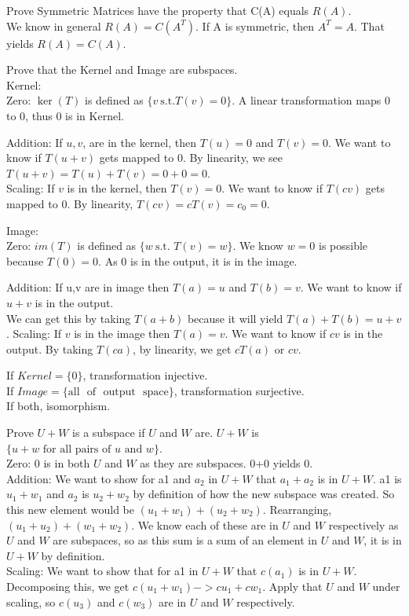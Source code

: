 \documentclass[12pt]{article}
\begin{document}
Prove Symmetric Matrices have the property that C(A) equals $R(A)$.\\
We know in general $R(A) = C(A^T)$. If A is symmetric, then $A^T=A$. That yields $R(A)=C(A)$.

Prove that the Kernel and Image are subspaces.\\
Kernel:\\
Zero: $\ker(T)$ is defined as $\{v ~ \text{s.t.} T(v) = 0\}$. A linear transformation maps 0 to 0, thus 0 is in Kernel.

Addition: If $u, v$, are in the kernel, then $T(u) = 0$ and $T(v) = 0$. We want to know if $T(u+v)$ gets
mapped to 0. By linearity, we see $T(u+v) = T(u)+T(v) = 0+0 = 0$.\\
Scaling: If $v$ is in the kernel, then $T(v) = 0$. We want to know if $T(cv)$ gets mapped to 0. By
linearity, $T(cv) = cT(v) = c_0 = 0$.

Image:\\
Zero: $im(T)$ is defined as $\{w ~ \text{s.t.  }  T(v) = w\}$. We know $w=0$ is possible because $T(0)=0$. As 0 is in the output, it is in the image.

Addition: If u,v are in image then $T(a) = u$ and $T(b) = v$. We want to know if $u+v$ is in the output.\\
We can get this by taking $T(a+b)$ because it will yield $T(a)+T(b) = u+v$.
Scaling: If $v$ is in the image then $T(a) = v$. We want to know if $cv$ is in the output. By taking $T(ca)$, by linearity, we get $cT(a)$ or $cv$.

If $Kernel = \{0\}$, transformation injective.\\
If $Image = \{\text{all ~of ~output ~space}\}$, transformation surjective.\\
If both, isomorphism.


Prove $U+W$ is a subspace if $U$ and $W$ are. $U+W$ is $\{u+w \text { for all pairs of } u \text{ and } w \}$.\\
Zero: 0 is in both $U$ and $W$ as they are subspaces. 0+0 yields 0.\\
Addition: We want to show for a1 and $a_2$ in $U+W$ that $a_1+a_2$ is in $U+W$. a1 is $u_1+w_1$ and $a_2$ is $u_2+w_2$ by definition of how the new subspace was created. So this new element would be
$(u_1+w_1)+(u_2+w_2)$. Rearranging, $(u_1+u_2)+(w_1+w_2)$. We know each of these are in $U$ and $W$
respectively as $U$ and $W$ are subspaces, so as this sum is a sum of an element in $U$ and $W$, it is
in $U+W$ by definition.\\
Scaling: We want to show that for a1 in $U+W$ that $c(a_1)$ is in $U+W$. Decomposing this, we get
$c(u_1+w_1)-> cu_1+cw_1$. Apply that $U$ and $W$ under scaling, so $c(u_3)$ and $c(w_3)$ are in $U$ and $W$
respectively.
\end{document}
